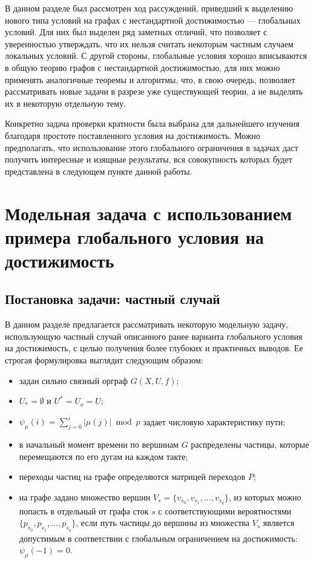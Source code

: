 В данном разделе был рассмотрен ход рассуждений, приведший к выделению нового типа условий на графах с нестандартной достижимостью --- глобальных условий. Для них был выделен ряд заметных отличий, что позволяет с уверенностью утверждать, что их нельзя считать некоторым частным случаем локальных условий. С другой стороны, глобальные условия хорошо вписываются в общую теорию графов с нестандартной достижимостью, для них можно применять аналогичные теоремы и алгоритмы, что, в свою очередь, позволяет рассматривать новые задачи в разрезе уже существующей теории, а не выделять их в некоторую отдельную тему. 

Конкретно задача проверки кратности была выбрана для дальнейшего изучения благодаря простоте поставленного условия на достижимость. Можно предполагать, что использование этого глобального ограничения в задачах даст получить интересные и изящные результаты, вся совокупность которых будет представлена в следующем пункте данной работы. 

\chapter{Модельная задача с использованием примера глобального условия на достижимость}

\section{Постановка задачи: частный случай}

В данном разделе предлагается рассматривать некоторую модельную задачу, использующую частный случай описанного ранее варианта глобального условия на достижимость, с целью получения более глубоких и практичных выводов. Ее строгая формулировка выглядит следующим образом:

\begin{itemize}
	\item задан сильно связный орграф $G(X,U,f)$;
	\item $U_* = \emptyset$ и $U^* = U_o = U$;
	\item $\psi_\mu(i) = \sum_{j=0}^i | \mu(j)|\bmod p$ задает числовую характеристику пути; 
	\item в начальный момент времени по вершинам $G$ распределены частицы, которые перемещаются по его дугам на каждом такте;
	\item переходы частиц на графе определяются матрицей переходов $P$;
	\item на графе задано множество вершин $V_s = \{v_{s_0}, v_{s_1}, ... , v_{s_q}\}$, из которых можно попасть в отдельный от графа сток $s$ с соответствующими вероятностями $\{p_{s_0}, p_{s_1}, ... , p_{s_q}\}$, если путь частицы до вершины из множества $V_s$ является допустимым в соответствии с глобальным ограничением на достижимость: $\psi_\mu(-1) = 0$.
\end{itemize}

